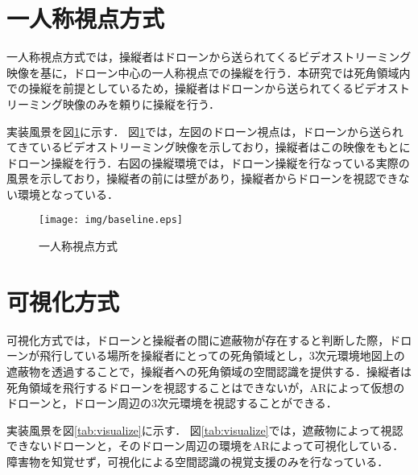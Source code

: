 \documentclass
[a4paper,11pt]{jreport}
\begin{document}

\section{一人称視点方式}
一人称視点方式では，操縦者はドローンから送られてくるビデオストリーミング映像を基に，ドローン中心の一人称視点での操縦を行う．本研究では死角領域内での操縦を前提としているため，操縦者はドローンから送られてくるビデオストリーミング映像のみを頼りに操縦を行う．
\par
実装風景を図\ref{tab:baseline}に示す．
図\ref{tab:baseline}では，左図のドローン視点は，ドローンから送られてきているビデオストリーミング映像を示しており，操縦者はこの映像をもとにドローン操縦を行う．右図の操縦環境では，ドローン操縦を行なっている実際の風景を示しており，操縦者の前には壁があり，操縦者からドローンを視認できない環境となっている．

\begin{figure}[t]
	\begin{center}
    \texttt{[image: img/baseline.eps]}
    \caption{一人称視点方式}
    \label{tab:baseline}
    \end{center}
\end{figure}

\clearpage

\section{可視化方式}
可視化方式では，ドローンと操縦者の間に遮蔽物が存在すると判断した際，ドローンが飛行している場所を操縦者にとっての死角領域とし，3次元環境地図上の遮蔽物を透過することで，操縦者への死角領域の空間認識を提供する．操縦者は死角領域を飛行するドローンを視認することはできないが，ARによって仮想のドローンと，ドローン周辺の3次元環境を視認することができる．
\par
実装風景を図\ref{tab:visualize}に示す．
図\ref{tab:visualize}では，遮蔽物によって視認できないドローンと，そのドローン周辺の環境をARによって可視化している．障害物を知覚せず，可視化による空間認識の視覚支援のみを行なっている．
\end{document}
